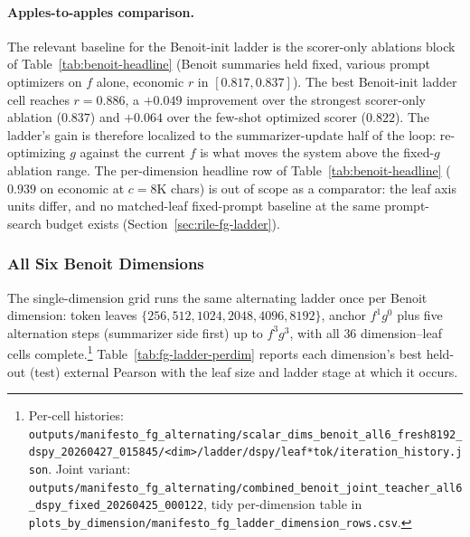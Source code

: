 \paragraph{Apples-to-apples comparison.} The relevant baseline for the
Benoit-init ladder is the scorer-only ablations block of
Table~\ref{tab:benoit-headline} (Benoit summaries held fixed, various
prompt optimizers on $f$ alone, economic $r$ in $[0.817, 0.837]$). The
best Benoit-init ladder cell reaches $r = 0.886$, a $+0.049$
improvement over the strongest scorer-only ablation ($0.837$) and
$+0.064$ over the few-shot optimized scorer ($0.822$). The
    ladder's gain is therefore localized to the summarizer-update half of
    the loop: re-optimizing $g$ against the current $f$ is what moves the
    system above the fixed-$g$ ablation range. The per-dimension
headline row of Table~\ref{tab:benoit-headline} ($0.939$ on economic
at $c = 8\mathrm{K}$ chars) is out of scope as a comparator: the leaf
axis units differ, and no matched-leaf fixed-prompt baseline at the
same prompt-search budget exists
(Section~\ref{sec:rile-fg-ladder}).

\subsubsection{All Six Benoit Dimensions}

The single-dimension grid runs the same alternating ladder once per
Benoit dimension: token leaves
$\{256, 512, 1024, 2048, 4096, 8192\}$, anchor $f^1 g^0$ plus five
alternation steps (summarizer side first) up to $f^3 g^3$, with all
$36$ dimension--leaf cells complete.\footnote{Per-cell histories:
\texttt{outputs/manifesto\_fg\_alternating/scalar\_dims\_benoit\_all6\_fresh8192\_dspy\_20260427\_015845/<dim>/ladder/dspy/leaf*tok/iteration\_history.json}.
Joint variant:
\texttt{outputs/manifesto\_fg\_alternating/combined\_benoit\_joint\_teacher\_all6\_dspy\_fixed\_20260425\_000122},
tidy per-dimension table in
\texttt{plots\_by\_dimension/manifesto\_fg\_ladder\_dimension\_rows.csv}.}
Table~\ref{tab:fg-ladder-perdim} reports each dimension's best
held-out (test) external Pearson with the leaf size and ladder stage
at which it occurs.


